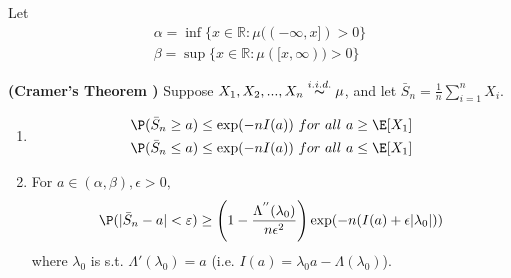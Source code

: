 \documentclass{article}
\newcommand{\bfs}[1]{\textbf{({#1})}}
\begin{document}
Let
		\begin{align*}
		\alpha=\inf\{x\in\mathbb{R}:\mu((-\infty,x])>0\}\\
		\beta=\sup\{x\in\mathbb{R}:\mu([x,\infty))>0\}
		\end{align*}

\begin{thma}{\bfs{Cramer's Theorem }}\label{ld:thm_cramer}
 Suppose $X_1,X_2,...,X_n\overset{i.i.d.}{\thicksim}\mu$, and let $\bar{S}_n=\frac{1}{n}\sum_{i=1}^{n}X_i$.
	\begin{enumerate}[label=(\roman*)]
	\item
	\begin{align*}
	\P(\bar{S}_n\geq a)\leq \exp(-nI(a))\ for\ all\ a\geq\E[X_1]\\
	\P(\bar{S}_n\leq a)\leq \exp(-nI(a))\ for\ all\ a\leq\E[X_1]
	\end{align*}
	\item
	 For $a\in(\alpha,\beta),\epsilon>0,$
	\begin{align*}
	\P(|\bar{S}_n- a|<\varepsilon)\geq \left(1-\frac{\Lambda^{''}(\lambda_0)}{n\epsilon^{2}}\right)\exp(-n(I(a)+\epsilon|\lambda_0|))
	\end{align*}
	where $\lambda_0$ is s.t. $\Lambda'(\lambda_0)=a$ (i.e. $I(a)=\lambda_0 a-\Lambda(\lambda_0)$).
	\end{enumerate}
\end{thma}
\end{document}
